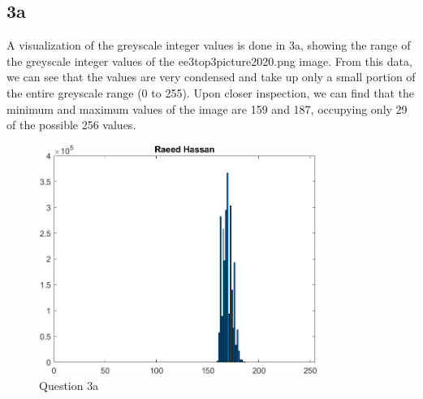 \documentclass[12pt]{article}
\begin{document}
\subsection*{3a}
A visualization of the greyscale integer values is done in 3a, showing the range of the greyscale integer values of the ee3top3picture2020.png image. From this data, we can see that the values are very condensed and take up only a small portion of the entire greyscale range (0 to 255). Upon closer inspection, we can find that the minimum and maximum values of the image are 159 and 187, occupying only 29 of the possible 256 values.

\begin{figure}[!ht]
    \centering
    \includegraphics[width=0.81\textwidth]{question3a.png}
    \caption{Question 3a}
    \label{fig:question3a}
\end{figure} \pagebreak
\end{document}
